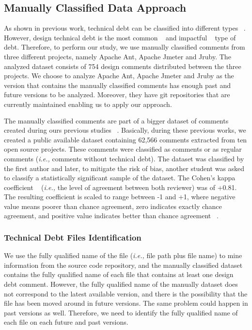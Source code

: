 \subsection*{Manually Classified Data Approach}
\label{sub:manually_classified_data_approach}

As shown in previous work, technical debt can be classified into different types ~\cite{Alves2014MTD}. However, design technical debt is the most common ~\cite{Maldonado2015MTD} and impactful ~\cite{Ernst2015FSE} type of debt. Therefore, to perform our study, we use manually classified \SATD comments from three different projects, namely Apache Ant, Apache Jmeter and Jruby. The analyzed dataset consists of 754 \SATD design comments distributed between the three projects. We choose to analyze Apache Ant, Apache Jmeter and Jruby as the version that contains the manually classified comments has enough past and future versions to be analyzed. Moreover, they have git repositories that are currently maintained enabling us to apply our approach. 

The manually classified comments are part of a bigger dataset of \SATD comments created during ours previous studies ~\cite{Maldonado2015MTD,Maldonado2015TSE}. Basically, during these previous works, we created a public available dataset containing 62,566 comments extracted from ten open source projects. These comments were classified as \SATD comments or as regular comments (\textit{i.e.,} comments without technical debt). The dataset was classified by the first author and later, to mitigate the risk of bias, another student was asked to classify a statistically significant sample of the dataset. The Cohen's kappa coefficient ~\cite{cohen1960coefficient} (\textit{i.e.,} the level of agreement between both reviewer) was of +0.81. The resulting coefficient is scaled to range between -1 and +1, where negative value means poorer than chance agreement, zero indicates exactly chance agreement, and positive value indicates better than chance agreement ~\cite{fleiss1973equivalence}.

\subsubsection*{Technical Debt Files Identification}
\label{subsub:technical_debt_files_identification}

We use the fully qualified name of the file (\textit{i.e.,} file path plus file name) to mine information from the source code repository, and the manually classified dataset contains the fully qualified name of each file that contains at least one \SATD design debt comment. However, the fully qualified name of the manually dataset does not correspond to the latest available version, and there is the possibility that the file has been moved around in future versions. The same problem could happen in past versions as well. Therefore, we need to identify the fully qualified name of each file on each future and past versions. 

